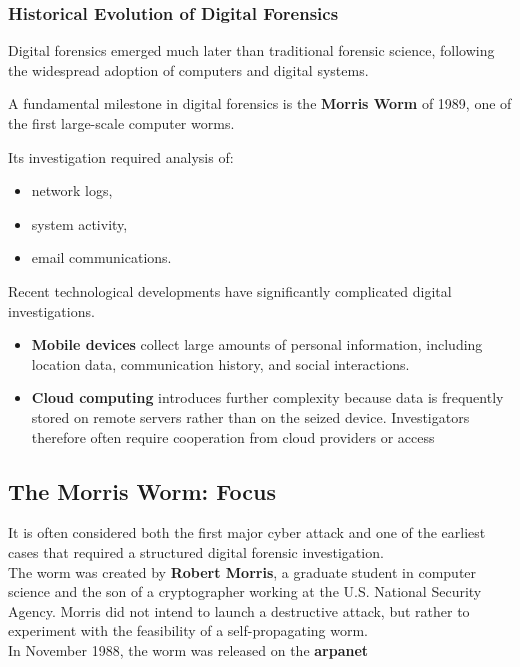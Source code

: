\subsubsection{Historical Evolution of Digital Forensics}

Digital forensics emerged much later than traditional forensic science, following the widespread adoption of computers and digital systems.
\bigskip

\noindent
A fundamental milestone in digital forensics is the \textbf{Morris Worm} of 1989, one of the first large-scale computer worms.
\medskip

\noindent
Its investigation required analysis of:
\begin{itemize}
\item network logs,
\item system activity,
\item email communications.
\end{itemize}

\noindent
Recent technological developments have significantly complicated digital investigations.

\begin{itemize}
  \item \textbf{Mobile devices} collect large amounts of personal information, including location data, communication history, and social interactions.
  \item \textbf{Cloud computing} introduces further complexity because data is frequently stored on remote servers rather than on the seized device. Investigators therefore often require cooperation from cloud providers or access
\end{itemize}


\subsection{The Morris Worm: Focus}

It is often considered both the first major cyber attack and one of the earliest cases that required a structured digital forensic investigation.\\
The worm was created by \textbf{Robert Morris}, a graduate student in computer science and the son of a cryptographer working at the U.S. National Security Agency. Morris did not intend to launch a destructive attack, but rather to experiment with the feasibility of a self-propagating worm.\\
In November 1988, the worm was released on the \textbf{arpanet}
